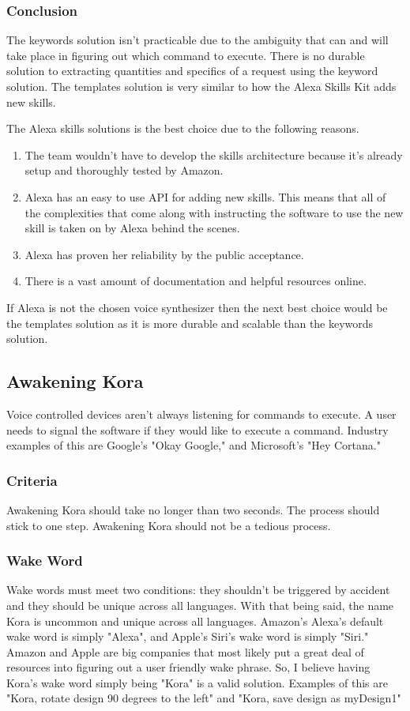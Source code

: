 \documentclass[onecolumn, draftclsnofoot,10pt, compsoc]{IEEEtran}
\begin{document}
	\subsubsection{Conclusion}
	The keywords solution isn't practicable due to the ambiguity that can and will take place in figuring out which command to execute.
	There is no durable solution to extracting quantities and specifics of a request using the keyword solution.
	The templates solution is very similar to how the Alexa Skills Kit adds new skills.

	The Alexa skills solutions is the best choice due to the following reasons.
	\begin{enumerate}
		\item{
			The team wouldn't have to develop the skills architecture because it's already setup and thoroughly tested by Amazon.}
		\item{
			Alexa has an easy to use API for adding new skills.
			This means that all of the complexities that come along with instructing the software to use the new skill is taken on by Alexa behind the scenes.}
		\item{
			Alexa has proven her reliability by the public acceptance.}
		\item{
			There is a vast amount of documentation and helpful resources online.}
	\end{enumerate}

	If Alexa is not the chosen voice synthesizer then the next best choice would be the templates solution as it is more durable and scalable than the keywords solution.


	\subsection{Awakening Kora}
	Voice controlled devices aren't always listening for commands to execute.
	A user needs to signal the software if they would like to execute a command.
	Industry examples of this are Google's "Okay Google," and Microsoft's "Hey Cortana."

	\subsubsection{Criteria}
	Awakening Kora should take no longer than two seconds.
	The process should stick to one step.
	Awakening Kora should not be a tedious process.

	\subsubsection{Wake Word}
	Wake words must meet two conditions: they shouldn't be triggered by accident and they should be unique across all languages.
	With that being said, the name Kora is uncommon and unique across all languages.
	Amazon's Alexa's default wake word is simply "Alexa", and Apple's Siri's wake word is simply "Siri."
	Amazon and Apple are big companies that most likely put a great deal of resources into figuring out a user friendly wake phrase.
	So, I believe having Kora's wake word simply being "Kora" is a valid solution.
	Examples of this are "Kora, rotate design 90 degrees to the left" and "Kora, save design as myDesign1"
\end{document}
